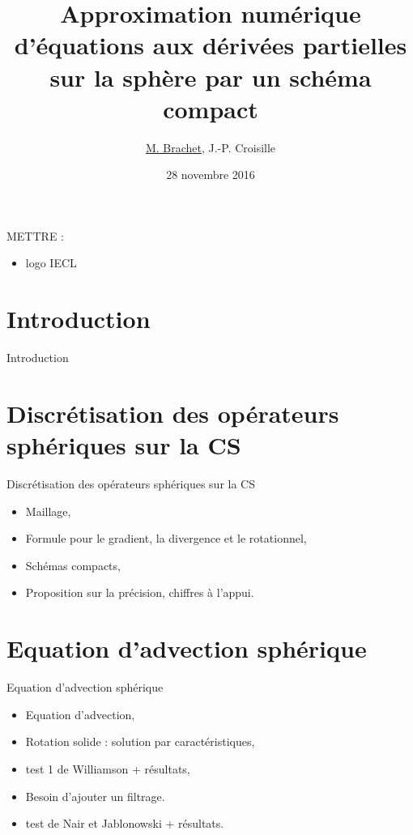 \documentclass[11pt]{beamer}
\author{\underline{M. Brachet}, J.-P. Croisille}
\title{Approximation numérique d'équations aux dérivées partielles sur la sphère par un schéma compact}
\institute{IECL}
\date{28 novembre 2016}
\begin{document}
\begin{frame}{}
\titlepage
METTRE :
\begin{itemize}
\item logo IECL
\end{itemize}
\end{frame}

\begin{frame}
\tableofcontents
\end{frame}

\section*{Introduction}
\begin{frame}{Introduction}

\end{frame}

\section{Discrétisation des opérateurs sphériques sur la CS}
\begin{frame}{Discrétisation des opérateurs sphériques sur la CS}
\begin{itemize}
\item Maillage,
\item Formule pour le gradient, la divergence et le rotationnel,
\item Schémas compacts,
\item Proposition sur la précision, chiffres à l'appui.
\end{itemize}

\end{frame}

\section{Equation d'advection sphérique}
\begin{frame}{Equation d'advection sphérique}
\begin{itemize}
\item Equation d'advection,
\item Rotation solide : solution par caractéristiques,
\item test 1 de Williamson + résultats,
\item Besoin d'ajouter un filtrage.
\item test de Nair et Jablonowski + résultats.
\end{itemize}
\end{frame}
\end{document}
